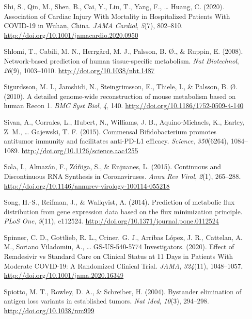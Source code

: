 \documentclass[12pt,twoside,openany,\mydriver]{thesis}  %
\begin{document}
\leavevmode\hypertarget{ref-shi_association_2020}{}%
Shi, S., Qin, M., Shen, B., Cai, Y., Liu, T., Yang, F., \ldots{} Huang, C. (2020). Association of Cardiac Injury With Mortality in Hospitalized Patients With COVID-19 in Wuhan, China. \emph{JAMA Cardiol}, \emph{5}(7), 802--810. \url{http://doi.org/10.1001/jamacardio.2020.0950}

\leavevmode\hypertarget{ref-shlomi_network-based_2008}{}%
Shlomi, T., Cabili, M. N., Herrgård, M. J., Palsson, B. Ø., \& Ruppin, E. (2008). Network-based prediction of human tissue-specific metabolism. \emph{Nat Biotechnol}, \emph{26}(9), 1003--1010. \url{http://doi.org/10.1038/nbt.1487}

\leavevmode\hypertarget{ref-sigurdsson_detailed_2010}{}%
Sigurdsson, M. I., Jamshidi, N., Steingrimsson, E., Thiele, I., \& Palsson, B. Ø. (2010). A detailed genome-wide reconstruction of mouse metabolism based on human Recon 1. \emph{BMC Syst Biol}, \emph{4}, 140. \url{http://doi.org/10.1186/1752-0509-4-140}

\leavevmode\hypertarget{ref-sivan_commensal_2015}{}%
Sivan, A., Corrales, L., Hubert, N., Williams, J. B., Aquino-Michaels, K., Earley, Z. M., \ldots{} Gajewski, T. F. (2015). Commensal Bifidobacterium promotes antitumor immunity and facilitates anti-PD-L1 efficacy. \emph{Science}, \emph{350}(6264), 1084--1089. \url{http://doi.org/10.1126/science.aac4255}

\leavevmode\hypertarget{ref-sola_continuous_2015}{}%
Sola, I., Almazán, F., Zúñiga, S., \& Enjuanes, L. (2015). Continuous and Discontinuous RNA Synthesis in Coronaviruses. \emph{Annu Rev Virol}, \emph{2}(1), 265--288. \url{http://doi.org/10.1146/annurev-virology-100114-055218}

\leavevmode\hypertarget{ref-song_prediction_2014}{}%
Song, H.-S., Reifman, J., \& Wallqvist, A. (2014). Prediction of metabolic flux distribution from gene expression data based on the flux minimization principle. \emph{PLoS One}, \emph{9}(11), e112524. \url{http://doi.org/10.1371/journal.pone.0112524}

\leavevmode\hypertarget{ref-spinner_effect_2020}{}%
Spinner, C. D., Gottlieb, R. L., Criner, G. J., Arribas López, J. R., Cattelan, A. M., Soriano Viladomiu, A., \ldots{} GS-US-540-5774 Investigators. (2020). Effect of Remdesivir vs Standard Care on Clinical Status at 11 Days in Patients With Moderate COVID-19: A Randomized Clinical Trial. \emph{JAMA}, \emph{324}(11), 1048--1057. \url{http://doi.org/10.1001/jama.2020.16349}

\leavevmode\hypertarget{ref-spiotto_bystander_2004}{}%
Spiotto, M. T., Rowley, D. A., \& Schreiber, H. (2004). Bystander elimination of antigen loss variants in established tumors. \emph{Nat Med}, \emph{10}(3), 294--298. \url{http://doi.org/10.1038/nm999}
\end{document}
